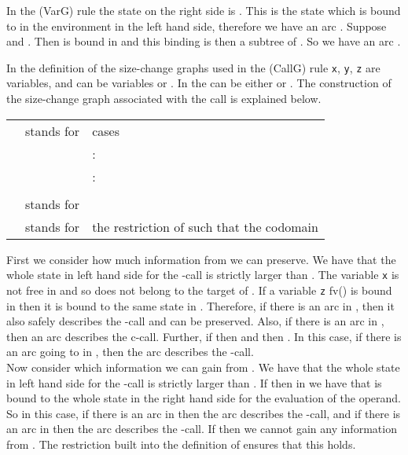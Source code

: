 \documentclass{LMCS}
\newcommand{\fl}{\noindent}
\newcommand{\vair}{\relax}
\newcommand{\bt}{\begin{tabular}}
\newcommand{\et}{\end{tabular}}
\theoremstyle{definition}\newtheorem{env}[thm]{Environment}
\begin{document}
\smallskip

\noindent In the (VarG) rule the state on the right side is . This is the state which  is bound to in the environment in the left hand side, therefore we have an arc . Suppose  and . Then  is bound in  and this binding is then a subtree of  . So we have an arc .





\noindent In the definition of the size-change graphs used in the
(CallG) rule {\tt x}, {\tt y}, {\tt z} are variables, and  can be
variables or .  In  the  can be either
 or .  The construction of the size-change graph
associated with the call is explained below.  \vair


\fl\bt{lll}
&stands for&cases\\

&&:   
\\

&&:  \\
&&     \\

  &stands for& 
\\

 &stands for&the restriction of  such that the codomain \\
\et
\bigskip

\fl First we consider how much information from  we can preserve. We have that the whole state  in left hand side for the -call is strictly larger than . 
The variable {\tt x} is not free in  and so does not belong to the target of . If a variable {\tt z}
   fv() is bound in 
 then it is bound to the same state in .
 Therefore, if there is an arc  in , then it also safely describes the -call and can be preserved. Also, if there is an arc  in , then an arc  describes the c-call. Further, if  then  and then . In this case, if there is an arc  going to  in , then  the arc  describes the -call.\\
Now consider which information we can gain from . We have that the whole state  in left hand side for the -call is strictly larger than .  
If  then in  we have that  is bound to the whole state in the right hand side for the evaluation of the operand. So in this case, if there is an arc  in   then  the arc  describes the -call, and if there is an arc  in   then  the arc  describes the -call. If  then we cannot gain any information from . 
The restriction built into the definition of  ensures that this holds.



\smallskip
\end{document}
